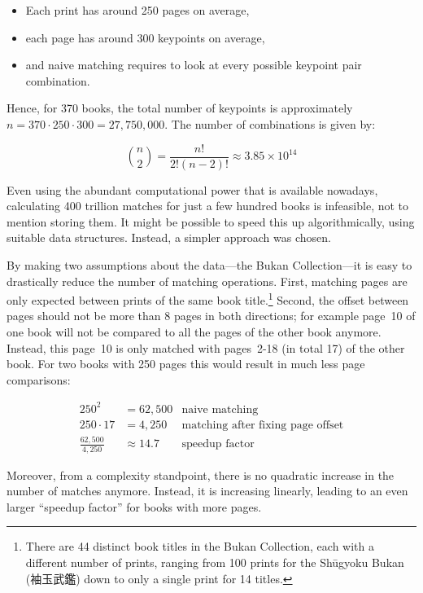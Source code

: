 \documentclass{ltjarticle}
\begin{document}
\begin{itemize}
    \setlength\itemsep{0em}
    \item Each print has around 250 pages on average,
    \item each page has around 300 keypoints on average,
    \item and naive matching requires to look at every possible keypoint pair combination.
\end{itemize}

Hence, for 370 books, the total number of keypoints is approximately $n = 370 \cdot 250 \cdot 300 = 27,750,000$. The number of combinations is given by:

\begin{equation*}
    \binom{n}{2} = \frac{n!}{2!(n-2)!} \approx 3.85 \times 10^{14}
\end{equation*}

Even using the abundant computational power that is available nowadays, calculating 400 trillion matches for just a few hundred books is infeasible, not to mention storing them. It might be possible to speed this up algorithmically, using suitable data structures. Instead, a simpler approach was chosen.

By making two assumptions about the data---the Bukan Collection---it is easy to drastically reduce the number of matching operations. First, matching pages are only expected between prints of the same book title.\footnote{There are 44 distinct book titles in the Bukan Collection, each with a different number of prints, ranging from 100 prints for the Shūgyoku Bukan (袖玉武鑑) down to only a single print for 14 titles.} Second, the offset between pages should not be more than 8 pages in both directions; for example page~10 of one book will not be compared to all the pages of the other book anymore. Instead, this page~10 is only matched with pages~2-18 (in total 17) of the other book. For two books with 250 pages this would result in much less page comparisons:

\begin{align*}
    250^2 &= 62,500 & \text{naive matching} \\
    250 \cdot 17 &= 4,250 & \text{matching after fixing page offset} \\
    \frac{62,500}{4,250} &\approx 14.7 & \text{speedup factor}
\end{align*}

Moreover, from a complexity standpoint, there is no quadratic increase in the number of matches anymore. Instead, it is increasing linearly, leading to an even larger “speedup factor” for books with more pages.
\end{document}
